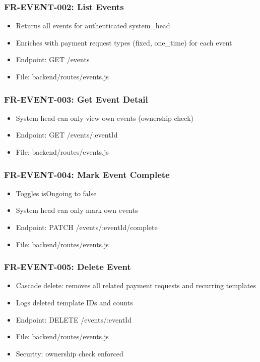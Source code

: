 \documentclass[12pt,a4paper]{article}
\begin{document}
\subsubsection{FR-EVENT-002: List Events}
\begin{itemize}
  \item Returns all events for authenticated system\_head
  \item Enriches with payment request types (fixed, one\_time) for each event
  \item Endpoint: GET /events
  \item File: backend/routes/events.js
\end{itemize}

\subsubsection{FR-EVENT-003: Get Event Detail}
\begin{itemize}
  \item System head can only view own events (ownership check)
  \item Endpoint: GET /events/:eventId
  \item File: backend/routes/events.js
\end{itemize}

\subsubsection{FR-EVENT-004: Mark Event Complete}
\begin{itemize}
  \item Toggles isOngoing to false
  \item System head can only mark own events
  \item Endpoint: PATCH /events/:eventId/complete
  \item File: backend/routes/events.js
\end{itemize}

\subsubsection{FR-EVENT-005: Delete Event}
\begin{itemize}
  \item Cascade delete: removes all related payment requests and recurring templates
  \item Logs deleted template IDs and counts
  \item Endpoint: DELETE /events/:eventId
  \item File: backend/routes/events.js
  \item Security: ownership check enforced
\end{itemize}
\end{document}
